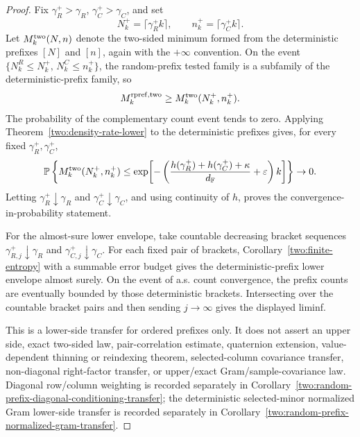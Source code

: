 \begin{proof}
Fix \(\gamma_R^+>\gamma_R\), \(\gamma_C^+>\gamma_C\), and set
\[
  N_k^+=\lceil\gamma_R^+k\rceil,\qquad
  n_k^+=\lceil\gamma_C^+k\rceil .
\]
Let \(M_k^{\rm two}(N,n)\) denote the two-sided minimum formed from the
deterministic prefixes \([N]\) and \([n]\), again with the \(+\infty\)
convention.  On the event
\(\{N_k^R\le N_k^+,\, N_k^C\le n_k^+\}\), the random-prefix tested family is a
subfamily of the deterministic-prefix family, so
\[
  M_k^{\rm rpref,two}\ge M_k^{\rm two}(N_k^+,n_k^+).
\]
The probability of the complementary count event tends to zero.  Applying
Theorem~\ref{two:density-rate-lower} to the deterministic prefixes gives, for
every fixed \(\gamma_R^+,\gamma_C^+\),
\[
  \mathbb{P}\left\{
  M_k^{\rm two}(N_k^+,n_k^+)\le
  \exp\!\left[-\left(
  \frac{h(\gamma_R^+)+h(\gamma_C^+)+\kappa}{d_{\mathbb{F}}}+\varepsilon
  \right)k\right]\right\}\to0.
\]
Letting \(\gamma_R^+\downarrow\gamma_R\) and
\(\gamma_C^+\downarrow\gamma_C\), and using continuity of \(h\), proves the
convergence-in-probability statement.

For the almost-sure lower envelope, take countable decreasing bracket sequences
\(\gamma_{R,j}^+\downarrow\gamma_R\) and
\(\gamma_{C,j}^+\downarrow\gamma_C\).  For each fixed pair of brackets,
Corollary~\ref{two:finite-entropy} with a summable error budget gives the
deterministic-prefix lower envelope almost surely.  On the event of a.s. count
convergence, the prefix counts are eventually bounded by those deterministic
brackets.  Intersecting over the countable bracket pairs and then sending
\(j\to\infty\) gives the displayed liminf.

This is a lower-side transfer for ordered prefixes only.  It does not assert an
upper side, exact two-sided law, pair-correlation estimate, quaternion
extension, value-dependent thinning or reindexing theorem, selected-column
covariance transfer, non-diagonal right-factor transfer, or
upper/exact Gram/sample-covariance law.  Diagonal row/column weighting is
recorded separately in
Corollary~\ref{two:random-prefix-diagonal-conditioning-transfer}; the
deterministic selected-minor normalized Gram lower-side transfer is recorded
separately in Corollary~\ref{two:random-prefix-normalized-gram-transfer}.
\end{proof}

